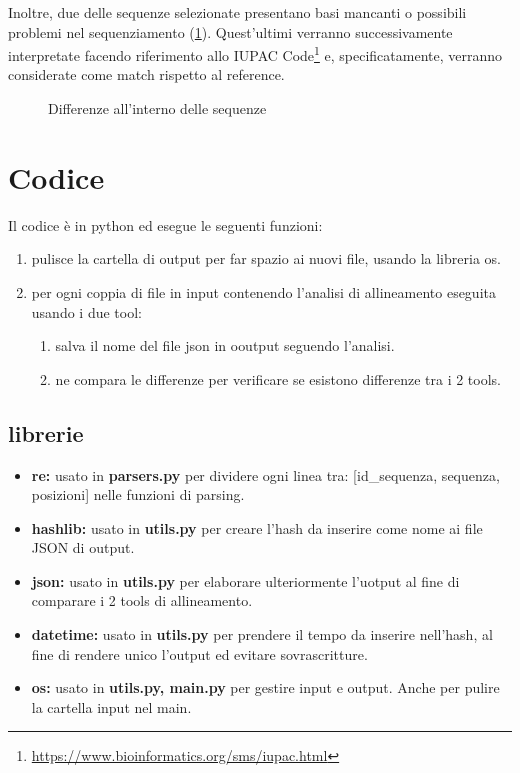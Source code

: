 \documentclass[11pt,italian]{article}
\begin{document}
Inoltre, due delle sequenze selezionate presentano basi mancanti o possibili problemi nel sequenziamento (\cref{fig:jalview-inner}).
Quest'ultimi verranno successivamente interpretate facendo riferimento allo IUPAC Code\footnote{\url{https://www.bioinformatics.org/sms/iupac.html}} e, specificatamente, verranno considerate come match rispetto al reference.

\begin{figure}[H]
  \caption{Differenze all'interno delle sequenze}
  \label{fig:jalview-inner}
\end{figure}

\section{Codice}
Il codice è in python ed esegue le seguenti funzioni:
\begin{enumerate}
  \item pulisce la cartella di output per far spazio ai nuovi file, usando la libreria os.
  \item per ogni coppia di file in input contenendo l'analisi di allineamento eseguita usando i due tool:
  \begin{enumerate}
    \item salva il nome del file json in ooutput seguendo l'analisi.
    \item ne compara le differenze per verificare se esistono differenze tra i 2 tools.
  \end{enumerate}
\end{enumerate}

\subsection{librerie}
\begin{itemize}
  \item\textbf{re:} usato in \textbf{parsers.py} per dividere ogni linea tra: [id\_sequenza, sequenza, posizioni] nelle funzioni di parsing.
  \item\textbf{hashlib:} usato in \textbf{utils.py} per creare l'hash da inserire come nome ai file JSON di output.
  \item\textbf{json:} usato in \textbf{utils.py} per elaborare ulteriormente l'uotput al fine di comparare i 2 tools di allineamento.
  \item\textbf{datetime:} usato in \textbf{utils.py} per prendere il tempo da inserire nell'hash, al fine di rendere unico l'output ed evitare sovrascritture.
  \item\textbf{os:} usato in \textbf{utils.py, main.py} per gestire input e output. Anche per pulire la cartella input nel main.
\end{itemize}
\end{document}
